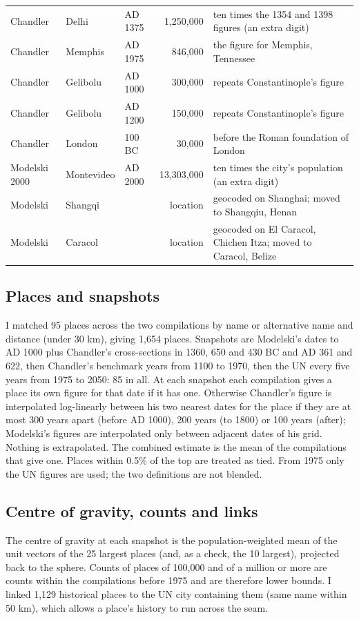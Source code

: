 \documentclass[11pt,a4paper]{article}
\begin{document}
\begin{longtable}{lllrp{6.2cm}}
Chandler & Delhi & AD 1375 & 1,250,000 & ten times the 1354 and 1398 figures (an extra digit)\\
Chandler & Memphis & AD 1975 & 846,000 & the figure for Memphis, Tennessee\\
Chandler & Gelibolu & AD 1000 & 300,000 & repeats Constantinople's figure\\
Chandler & Gelibolu & AD 1200 & 150,000 & repeats Constantinople's figure\\
Chandler & London & 100 BC & 30,000 & before the Roman foundation of London\\
Modelski 2000 & Montevideo & AD 2000 & 13,303,000 & ten times the city's population (an extra digit)\\
Modelski & Shangqi &  & location & geocoded on Shanghai; moved to Shangqiu, Henan\\
Modelski & Caracol &  & location & geocoded on El Caracol, Chichen Itza; moved to Caracol, Belize\\
\bottomrule\end{longtable}

\subsection{Places and snapshots}
I matched 95 places across the two compilations by name or alternative name and distance (under 30 km), giving 1,654 places. Snapshots are Modelski's dates to AD 1000 plus Chandler's cross-sections in 1360, 650 and 430 BC and AD 361 and 622, then Chandler's benchmark years from 1100 to 1970, then the UN every five years from 1975 to 2050: 85 in all. At each snapshot each compilation gives a place its own figure for that date if it has one. Otherwise Chandler's figure is interpolated log-linearly between his two nearest dates for the place if they are at most 300 years apart (before AD 1000), 200 years (to 1800) or 100 years (after); Modelski's figures are interpolated only between adjacent dates of his grid. Nothing is extrapolated. The combined estimate is the mean of the compilations that give one. Places within 0.5\% of the top are treated as tied. From 1975 only the UN figures are used; the two definitions are not blended.

\subsection{Centre of gravity, counts and links}
The centre of gravity at each snapshot is the population-weighted mean of the unit vectors of the 25 largest places (and, as a check, the 10 largest), projected back to the sphere. Counts of places of 100,000 and of a million or more are counts within the compilations before 1975 and are therefore lower bounds. I linked 1,129 historical places to the UN city containing them (same name within 50 km), which allows a place's history to run across the seam.
\end{document}
